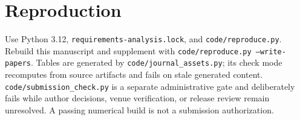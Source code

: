 \documentclass[11pt]{article}
\begin{document}
\section{Reproduction}
Use Python 3.12, \texttt{requirements-analysis.lock}, and
\texttt{code/reproduce.py}. Rebuild this manuscript and supplement with
\texttt{code/reproduce.py --write-papers}. Tables are generated by
\texttt{code/journal\_assets.py}; its check mode recomputes from source artifacts
and fails on stale generated content. \texttt{code/submission\_check.py} is a
separate administrative gate and deliberately fails while author decisions,
venue verification, or release review remain unresolved. A passing numerical
build is not a submission authorization.
\end{document}
